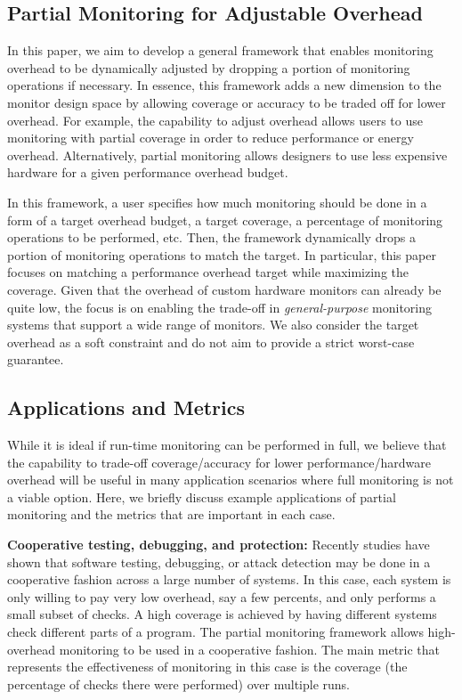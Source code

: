 \subsection{Partial Monitoring for Adjustable Overhead}

In this paper, we aim to develop a general framework that enables monitoring
overhead to be dynamically adjusted by dropping a portion of monitoring 
operations if necessary. In essence, this framework adds a new dimension to
the monitor design space by allowing coverage or accuracy to be traded off
for lower overhead. For example, the capability to adjust overhead allows users
to use monitoring with partial coverage in order to reduce performance
or energy overhead. Alternatively, partial monitoring allows designers to use
less expensive hardware for a given performance overhead budget.

In this framework, a user specifies how much monitoring should be done in a form of
a target 
overhead budget, a target coverage, a percentage of monitoring operations to be performed, etc.
Then, the framework dynamically drops a portion of monitoring operations to match
the target. In particular, this paper focuses on matching a performance overhead target
while maximizing the coverage. Given that the overhead of custom hardware monitors can
already be quite low, the focus is on enabling the trade-off in {\em general-purpose} 
monitoring systems that support a wide range of monitors.
We also consider the target overhead as a soft constraint and do not aim to
provide a strict worst-case guarantee.

\subsection{Applications and Metrics}

While it is ideal if run-time monitoring can be performed in full, we believe that
the capability to trade-off coverage/accuracy for lower performance/hardware overhead
will be useful in many application scenarios where full monitoring is not a viable option.
Here, we briefly discuss example applications of partial monitoring and the metrics
that are important in each case.

{\bf Cooperative testing, debugging, and protection:}
Recently studies \cite{liblit-pldi05, chilimbi-asplos04, greathouse-cgo11, testudo-micro08} have shown that software testing, debugging,
or attack detection may be done in a cooperative fashion across
a large number of systems. In this case, each system is only willing to pay very low
overhead, say a few percents, and only performs a small subset of checks. 
A high coverage is achieved by having different systems check different parts of a program.
The partial monitoring framework allows high-overhead monitoring to be used in a
cooperative fashion. 
The main metric that represents the effectiveness of monitoring in this case is
the coverage (the percentage of checks there were performed) over multiple runs.

